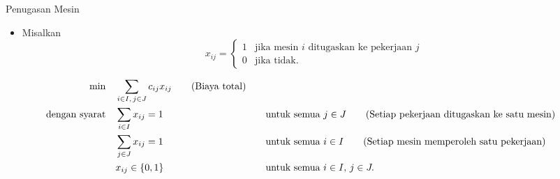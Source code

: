 \begin{examplewithallcode}{Penugasan Mesin}
\begin{itemize}
\item Misalkan
\begin{equation*}
x_{ij} = \begin{cases}
1 & \text{jika mesin $i$ ditugaskan ke pekerjaan $j$}\\
0 & \text{jika tidak.}
\end{cases}
\end{equation*}
\end{itemize}

\begin{align*}
\min \quad & \sum_{i \in I,\, j \in J} c_{ij} x_{ij}   \tag{Biaya total} \\
\mbox{dengan syarat}\quad        & \sum_{i \in I} x_{ij} = 1 &&\quad \mbox{untuk semua } j \in J   \tag{Setiap pekerjaan ditugaskan ke satu mesin} \\
             & \sum_{j \in J} x_{ij} = 1 &&\quad \mbox{untuk semua } i \in I   \tag{Setiap mesin memperoleh satu pekerjaan} \\
             & x_{ij} \in \{0,1\} &&\quad \mbox{untuk semua } i \in I,\, j \in J.
\end{align*}
\end{examplewithallcode}

